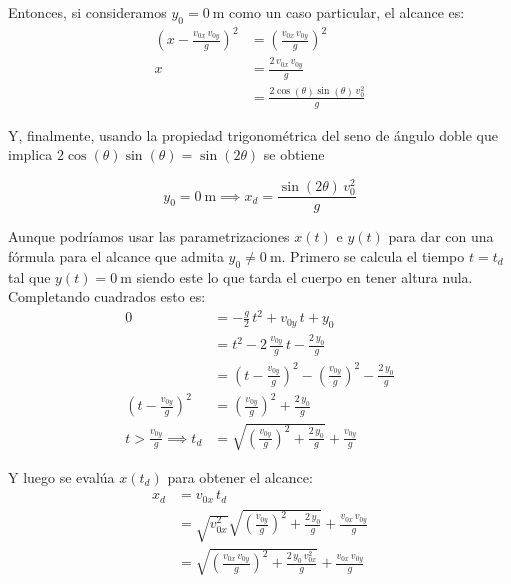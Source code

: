 Entonces, si consideramos $y_0=\SI{0}{\metre}$ como un caso particular, el alcance es:
\begin{align*}
    \left(x - \frac{v_{0x} \, v_{0y}}{g}\right)^2 &= \left(\frac{v_{0x} \, v_{0y}}{g}\right)^2
    \\[1ex]
    x &= \frac{2 \, v_{0x} \, v_{0y}}{g}
    \\[1ex]
    &= \frac{2 \cos(\theta) \sin(\theta) \, v_0^2}{g}
\end{align*}

Y, finalmente, usando la propiedad trigonométrica del seno de ángulo doble que implica $2 \cos(\theta) \sin(\theta)=\sin(2\theta)$ se obtiene

\begin{mdframed}[style=PropertyFrame]
    \begin{prop}
        \label{prop:oblicuoAlcance}
    \end{prop}
    \begin{equation*}
        y_0 = \SI{0}{\metre} \implies x_d = \frac{\sin(2\theta) \, v_0^2}{g}
    \end{equation*}
\end{mdframed}

Aunque podríamos usar las parametrizaciones $x(t)$ e $y(t)$ para dar con una fórmula para el alcance que admita $y_0 \neq \SI{0}{\metre}$.
Primero se calcula el tiempo $t=t_d$ tal que $y(t)=\SI{0}{\metre}$ siendo este lo que tarda el cuerpo en tener altura nula.
Completando cuadrados esto es:
\begin{align*}
    0 &= -\frac{g}{2} \, t^2 + v_{0y} \, t + y_0
    \\[1ex]
    &= t^2 - 2 \, \frac{v_{0y}}{g} \, t - \frac{2\,y_0}{g}
    \\[1ex]
    &= \left( t - \frac{v_{0y}}{g} \right)^2 - \left(\frac{v_{0y}}{g}\right)^2 - \frac{2\,y_0}{g}
    \\[1ex]
    \left( t - \frac{v_{0y}}{g} \right)^2 &= \left(\frac{v_{0y}}{g}\right)^2 + \frac{2\,y_0}{g}
    \\[1ex]
    t>\frac{v_{0y}}{g} \implies t_d &= \sqrt{\left(\frac{v_{0y}}{g}\right)^2 + \frac{2\,y_0}{g}} + \frac{v_{0y}}{g}
\end{align*}

Y luego se evalúa $x(t_d)$ para obtener el alcance:
\begin{align*}
    x_d &= v_{0x} \, t_d
    \\[1ex]
    &= \sqrt{v_{0x}^2} \sqrt{\left(\frac{v_{0y}}{g}\right)^2 + \frac{2\,y_0}{g}} + \frac{v_{0x}\,v_{0y}}{g}
    \\[1ex]
    &= \sqrt{\left(\frac{v_{0x}\,v_{0y}}{g}\right)^2 + \frac{2 \, y_0 \, v_{0x}^2}{g}} + \frac{v_{0x}\,v_{0y}}{g}
\end{align*}

